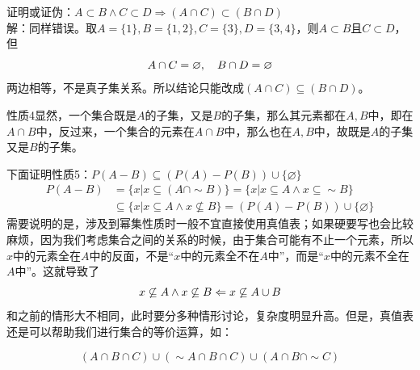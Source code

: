 证明或证伪：$A\subset B\land C\subset D\Rightarrow (A\cap C)\subset (B\cap D)$\\
解：同样错误。取$A=\{1\},B=\{1,2\},C=\{3\},D=\{3,4\}$，则$A\subset B$且$C\subset D$，但
\vspace{-10pt}\[A\cap C=\varnothing,\quad B\cap D=\varnothing\vspace{-10pt}\]
两边相等，不是真子集关系。所以结论只能改成$(A\cap C)\subseteq (B\cap D)$。

性质4显然，一个集合既是$A$的子集，又是$B$的子集，那么其元素都在$A,B$中，即在$A\cap B$中，反过来，一个集合的元素在$A\cap B$中，那么也在$A,B$中，故既是$A$的子集又是$B$的子集。

下面证明性质5：$ P(A - B) \subseteq (P(A) - P(B))\cup\{\varnothing\}$
\begin{align*}
P(A - B) &= \{x|x\subseteq (A\cap\sim B)\}=\{x|x\subseteq A\land x\subseteq\sim B\}\\
&\subseteq\{x|x\subseteq A\land x\not\subseteq B\}=(P(A)-P(B))\cup\{\varnothing\}
\end{align*}
需要说明的是，涉及到幂集性质时一般不宜直接使用真值表；如果硬要写也会比较麻烦，因为我们考虑集合之间的关系的时候，由于集合可能有不止一个元素，所以$x$中的元素全在$A$中的反面，不是“$x$中的元素全不在$A$中”，而是“$x$中的元素不全在$A$中”。这就导致了\vspace{-10pt}\[x\not\subseteq A\land x\not\subseteq B\Leftarrow x\not\subseteq A\cup B\vspace{-10pt}\]和之前的情形大不相同，此时要分多种情形讨论，复杂度明显升高。但是，真值表还是可以帮助我们进行集合的等价运算，如：
\begin{example}{}{}
\[(A\cap B\cap C)\cup(\sim A\cap B\cap C)\cup(A\cap B\cap\sim C)\]\end{example}
